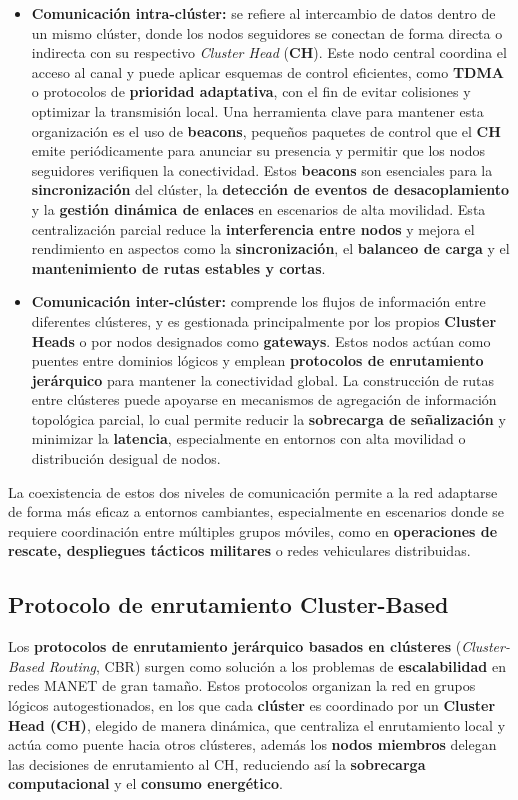 \documentclass{article}
\begin{document}
\begin{itemize}
    \item \textbf{Comunicación intra-clúster:} se refiere al intercambio de datos dentro de un mismo clúster, donde los nodos seguidores se conectan de forma directa o indirecta con su respectivo \textit{Cluster Head} (\textbf{CH}). Este nodo central coordina el acceso al canal y puede aplicar esquemas de control eficientes, como \textbf{TDMA} o protocolos de \textbf{prioridad adaptativa}, con el fin de evitar colisiones y optimizar la transmisión local. Una herramienta clave para mantener esta organización es el uso de \textbf{beacons}, pequeños paquetes de control que el \textbf{CH} emite periódicamente para anunciar su presencia y permitir que los nodos seguidores verifiquen la conectividad. Estos \textbf{beacons} son esenciales para la \textbf{sincronización} del clúster, la \textbf{detección de eventos de desacoplamiento} y la \textbf{gestión dinámica de enlaces} en escenarios de alta movilidad. Esta centralización parcial reduce la \textbf{interferencia entre nodos} y mejora el rendimiento en aspectos como la \textbf{sincronización}, el \textbf{balanceo de carga} y el \textbf{mantenimiento de rutas estables y cortas}.

    \item \textbf{Comunicación inter-clúster:} comprende los flujos de información entre diferentes clústeres, y es gestionada principalmente por los propios \textbf{Cluster Heads} o por nodos designados como \textbf{gateways}. Estos nodos actúan como puentes entre dominios lógicos y emplean \textbf{protocolos de enrutamiento jerárquico} para mantener la conectividad global. La construcción de rutas entre clústeres puede apoyarse en mecanismos de agregación de información topológica parcial, lo cual permite reducir la \textbf{sobrecarga de señalización} y minimizar la \textbf{latencia}, especialmente en entornos con alta movilidad o distribución desigual de nodos.
\end{itemize}

La coexistencia de estos dos niveles de comunicación permite a la red adaptarse de forma más eficaz a entornos cambiantes, especialmente en escenarios donde se requiere coordinación entre múltiples grupos móviles, como en \textbf{operaciones de rescate, despliegues tácticos militares} o redes vehiculares distribuidas.

\subsection{Protocolo de enrutamiento Cluster-Based}
Los \textbf{protocolos de enrutamiento jerárquico basados en clústeres} (\textit{Cluster-Based Routing}, CBR) surgen como solución a los problemas de \textbf{escalabilidad} en redes MANET de gran tamaño. Estos protocolos organizan la red en grupos lógicos autogestionados, en los que cada \textbf{clúster} es coordinado por un \textbf{Cluster Head (CH)}, elegido de manera dinámica, que centraliza el enrutamiento local y actúa como puente hacia otros clústeres, además los \textbf{nodos miembros} delegan las decisiones de enrutamiento al CH, reduciendo así la \textbf{sobrecarga computacional} y el \textbf{consumo energético}.\\
\end{document}
